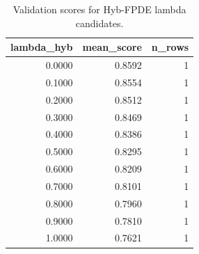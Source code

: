 \begin{table}[t]
\caption{Validation scores for Hyb-FPDE lambda candidates.}
\label{tab:lambda_distribution_computed}
\centering
\begin{tabular}{rrr}
\toprule
lambda\_hyb & mean\_score & n\_rows \\
\midrule
0.0000 & 0.8592 & 1 \\
0.1000 & 0.8554 & 1 \\
0.2000 & 0.8512 & 1 \\
0.3000 & 0.8469 & 1 \\
0.4000 & 0.8386 & 1 \\
0.5000 & 0.8295 & 1 \\
0.6000 & 0.8209 & 1 \\
0.7000 & 0.8101 & 1 \\
0.8000 & 0.7960 & 1 \\
0.9000 & 0.7810 & 1 \\
1.0000 & 0.7621 & 1 \\
\bottomrule
\end{tabular}

\end{table}
